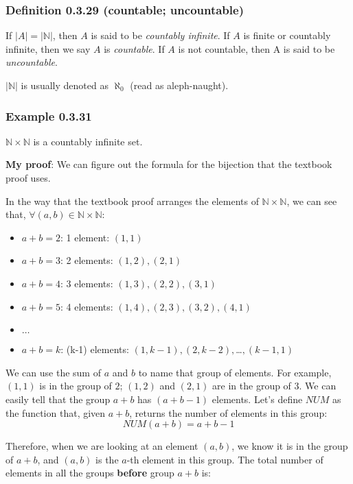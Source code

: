 \documentclass[12pt, letterpaper, oneside]{book}
\begin{document}
\subsubsection{Definition 0.3.29 (countable; uncountable)}

If $|A| = |\mathbb{N}|$, then $A$ is said to be \textit{countably infinite}. If
$A$ is finite or countably infinite, then we say $A$ is \textit{countable}. If
$A$ is not countable, then A is said to be \textit{uncountable}.

$|\mathbb{N}|$ is usually denoted as $\aleph_0$ (read as aleph-naught).

\subsubsection{Example 0.3.31}

$\mathbb{N} \times \mathbb{N}$ is a countably infinite set.

\colorbox{lime!100}{\textbf{My proof}}: We can figure out the formula for the
bijection that the textbook proof uses.

In the way that the textbook proof arranges the elements of $\mathbb{N} \times
  \mathbb{N}$, we can see that, $\forall (a, b) \in \mathbb{N} \times \mathbb{N}$:
\begin{itemize}
  \item $a + b = 2$: 1 element: $(1, 1)$
  \item $a + b = 3$: 2 elements: $(1, 2), (2, 1)$
  \item $a + b = 4$: 3 elements: $(1, 3), (2, 2), (3, 1)$
  \item $a + b = 5$: 4 elements: $(1, 4), (2, 3), (3, 2), (4, 1)$
  \item $\ldots$
  \item $a + b = k$: (k-1) elements: $(1, k-1), (2, k-2), $\ldots$, (k-1, 1)$
\end{itemize}

We can use the sum of $a$ and $b$ to name that group of elements. For example,
$(1, 1)$ is in the group of $2$; $(1, 2)$ and $(2, 1)$ are in the group of $3$.
We can easily tell that the group $a + b$ has $(a + b -1)$ elements. Let's
define $NUM$ as the function that, given $a + b$, returns the number of elements
in this group: \[NUM(a + b) = a + b -1\]

Therefore, when we are looking at an element $(a, b)$, we know it is in the
group of $a + b$, and $(a, b)$ is the $a$-th element in this group. The total
number of elements in all the groups \textbf{before} group $a + b$ is:
\end{document}
